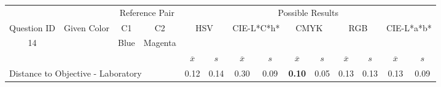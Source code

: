 \begin{table}[H]
  \resizebox{\textwidth}{!} {
  \begin{tabular}{lccccccccccccc}
    \hline
    \multicolumn{1}{c}{}                              &                                      & \multicolumn{2}{c}{Reference Pair}                   & \multicolumn{10}{c}{Possible Results}                                                                                                                                                                                                                                                                                        \\ \cline{3-14}
    \multicolumn{1}{c}{\multirow{-2}{*}{Question ID}} & \multirow{-2}{*}{Given Color}        & C1                       & C2                         & \multicolumn{2}{c}{HSV}                                        & \multicolumn{2}{c}{CIE-L*C*h*}                                 & \multicolumn{2}{c}{CMYK}                                       & \multicolumn{2}{c}{RGB}                                        & \multicolumn{2}{c}{CIE-L*a*b*}                                 \\ \hline
    \multicolumn{1}{c}{14}                             & \cellcolor[HTML]{8000FF}{\color[HTML]{FFFFFF}(27, 12, 95)} & \multicolumn{1}{c|}{Blue} & \multicolumn{1}{c|}{Magenta}  & \multicolumn{2}{c|}{\cellcolor[HTML]{8000FF}{\color[HTML]{FFFFFF}(27, 12, 95)}}      & \multicolumn{2}{c|}{\cellcolor[HTML]{B000FF}{\color[HTML]{FFFFFF}(36, 16, 96)}}       & \multicolumn{2}{c|}{\cellcolor[HTML]{8000FF}{\color[HTML]{FFFFFF}(27, 12, 95)}}       & \multicolumn{2}{c|}{\cellcolor[HTML]{8000FF}{\color[HTML]{FFFFFF}(27, 12, 95)}}       & \multicolumn{2}{c|}{\cellcolor[HTML]{AB00FF}{\color[HTML]{FFFFFF}(35, 16, 96)}}       \\ \hline
                                                      & \multicolumn{1}{l}{}                 & \multicolumn{1}{l}{}     & \multicolumn{1}{l}{}       & \multicolumn{1}{c}{$\overline{x}$} & \multicolumn{1}{c}{$s$} & \multicolumn{1}{c}{$\overline{x}$} & \multicolumn{1}{c}{$s$} & \multicolumn{1}{c}{$\overline{x}$} & \multicolumn{1}{c}{$s$} & \multicolumn{1}{c}{$\overline{x}$} & \multicolumn{1}{c}{$s$} & \multicolumn{1}{c}{$\overline{x}$} & \multicolumn{1}{c}{$s$} \\ \hline
    \multicolumn{4}{l}{Distance to Objective - Laboratory}                                                                                           & \multicolumn{1}{|c}{0.12}       & \multicolumn{1}{c|}{0.14}    & \multicolumn{1}{|c}{0.30}       & \multicolumn{1}{c|}{0.09}    & \multicolumn{1}{|c}{\textbf{0.10}}       & \multicolumn{1}{c|}{0.05}    & \multicolumn{1}{|c}{0.13}       & \multicolumn{1}{c|}{0.13}    & \multicolumn{1}{|c}{0.13}       & \multicolumn{1}{c|}{0.09}    \\

\end{tabular}}
\end{table}
